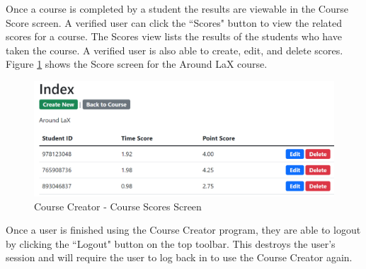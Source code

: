 Once a course is completed by a student the results are viewable in the Course Score screen. A verified user can click the ``Scores" button to view the related scores for a course. The Scores view lists the results of the students who have taken the course. A verified user is also able to create, edit, and delete scores. Figure \ref{CC Scores} shows the Score screen for the Around LaX course.
\begin{figure}[htb]
	\centering
	\includegraphics[width=.5\textwidth]{Requirements/assets/cc-score-viewer.png}
	\caption[Course Creator - Course Scores Screen]{\label{CC Scores}Course Creator - Course Scores Screen}
\end{figure} 
Once a user is finished using the Course Creator program, they are able to logout by clicking the ``Logout" button on the top toolbar. This destroys the user's session and will require the user to log back in to use the Course Creator again.
